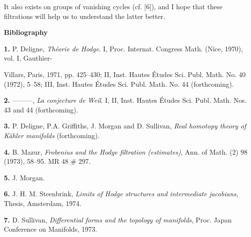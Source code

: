 It also exists on groups of vanishing cycles (cf. [6]), and I hope that these filtrations will help us to understand the latter better.

\begin{center}\sffamily\bfseries Bibliography\end{center}

\noindent\textbf{1.} P. Deligne, \emph{Théorie de Hodge}. I, Proc. Internat. Congress Math. (Nice, 1970), vol. I, Gauthier-
\EndSourcePage

\SparseReaderFont
Villars, Paris, 1971, pp. 425--430; II, Inst. Hautes Études Sci. Publ. Math. No. 40 (1972), 5--58; III, Inst. Hautes Études Sci. Publ. Math. No. 44 (forthcoming).

\noindent\textbf{2.} ---\hspace{-0.2em}---\hspace{-0.2em}---, \emph{La conjecture de Weil}. I, II, Inst. Hautes Études Sci. Publ. Math. Nos. 43 and 44 (forthcoming).

\noindent\textbf{3.} P. Deligne, P.A. Griffiths, J. Morgan and D. Sullivan, \emph{Real homotopy theory of Kähler manifolds} (forthcoming).

\noindent\textbf{4.} B. Mazur, \emph{Frobenius and the Hodge filtration (estimates)}, Ann. of Math. (2) 98 (1973), 58--95. MR 48 \# 297.

\noindent\textbf{5.} J. Morgan.

\noindent\textbf{6.} J. H. M. Steenbrink, \emph{Limits of Hodge structures and intermediate jacobians}, Thesis, Amsterdam, 1974.

\noindent\textbf{7.} D. Sullivan, \emph{Differential forms and the topology of manifolds}, Proc. Japan Conference on Manifolds, 1973.

\vspace{8mm}

\vfill
{}
